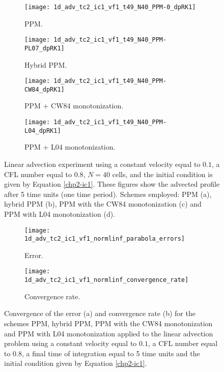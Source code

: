 \newpage
\begin{figure}[!htb]
  \centering
  \begin{subfigure}{0.45\textwidth}
    \centering
			\texttt{[image: 1d\_adv\_tc2\_ic1\_vf1\_t49\_N40\_PPM-0\_dpRK1]}
			\caption{PPM.\label{chp2-sec-exp-adv1-a}}
  \end{subfigure}
  \begin{subfigure}{0.45\textwidth}
    \centering
			\texttt{[image: 1d\_adv\_tc2\_ic1\_vf1\_t49\_N40\_PPM-PL07\_dpRK1]}
			\caption{Hybrid PPM.\label{chp2-sec-exp-adv1-b}}
  \end{subfigure}

  \begin{subfigure}{0.45\textwidth}
    \centering
		\texttt{[image: 1d\_adv\_tc2\_ic1\_vf1\_t49\_N40\_PPM-CW84\_dpRK1]}
    \caption{PPM + CW84 monotonization.\label{chp2-sec-exp-adv1-c}}
  \end{subfigure}
  \begin{subfigure}{0.45\textwidth}
    \centering
			\texttt{[image: 1d\_adv\_tc2\_ic1\_vf1\_t49\_N40\_PPM-L04\_dpRK1]}
      \caption{PPM + L04 monotonization.\label{chp2-sec-exp-adv1-d}}
  \end{subfigure} 
	\caption{Linear advection experiment using a constant velocity equal to $0.1$,
  a CFL number equal to $0.8$, $N=40$ cells, and the initial condition is given by Equation \eqref{chp2-ic1}.
	These figures show the advected profile after 5 time units (one time period).
	Schemes employed: PPM (a), hybrid PPM (b), PPM with the CW84 monotonization
	(c) and PPM with L04 monotonization (d). \label{chp2-sec-exp-adv1}}
\end{figure}

\begin{figure}[!htb]
  \centering
  \begin{subfigure}{0.45\textwidth}
    \centering
		\texttt{[image: 1d\_adv\_tc2\_ic1\_vf1\_normlinf\_parabola\_errors]}
		\caption{Error.\label{chp2-sec-exp-adv1-error}}
  \end{subfigure}
  \begin{subfigure}{0.45\textwidth}
    \centering
			\texttt{[image: 1d\_adv\_tc2\_ic1\_vf1\_normlinf\_convergence\_rate]}
		\caption{Convergence rate.\label{chp2-sec-exp-adv1-CR}}
  \end{subfigure}
	\caption{Convergence of the error (a) and convergence rate (b) for the schemes
  PPM, hybrid PPM, PPM with the CW84 monotonization and PPM with L04 monotonization
	applied to the linear advection problem using a constant velocity equal to $0.1$,
	a CFL number equal to $0.8$, a final time of integration equal to 5 time units
	and the initial condition given by Equation \eqref{chp2-ic1}.\label{chp2-sec-exp-adv1-2}}
\end{figure}

